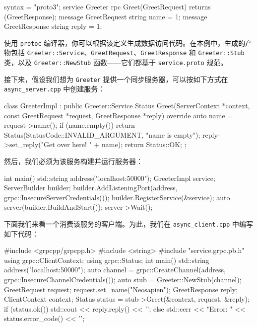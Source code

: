 \begin{codebox}[text]
syntax = "proto3";
service Greeter {
 rpc Greet(GreetRequest) returns (GreetResponse);
}
message GreetRequest {
 string name = 1;
}
message GreetResponse {
 string reply = 1;
}
\end{codebox}

\label{idx:1704}
使用 \texttt{protoc} 编译器，你可以根据该定义生成数据访问代码。在本例中，生成的产物包括 \texttt{Greeter::\allowbreak{}Service}、\texttt{Greet\allowbreak{}Request}、\texttt{Greet\allowbreak{}Response} 和 \texttt{Greeter::\allowbreak{}Stub} 类，以及 \texttt{Greeter::\allowbreak{}New\allowbreak{}Stub} 函数——它们都基于 \texttt{service.\allowbreak{}proto} 规范。

接下来，假设我们想为 \texttt{Greeter} 提供一个同步服务器，可以按如下方式在 \texttt{async\_\allowbreak{}server.\allowbreak{}cpp} 中创建服务：

\begin{codebox}[cpp]
class GreeterImpl : public Greeter::Service {
  Status Greet(ServerContext *context, const GreetRequest *request,
               GreetResponse *reply) override {
    auto name = request->name();
    if (name.empty()) {
      return Status(StatusCode::INVALID_ARGUMENT, "name is empty");
    }
    reply->set_reply("Get over here! " + name);
    return Status::OK;
  }
};
\end{codebox}

然后，我们必须为该服务构建并运行服务器：

\begin{codebox}[cpp]
int main() {
  std::string address("localhost:50000");
  GreeterImpl service;
  ServerBuilder builder;
  builder.AddListeningPort(address, grpc::InsecureServerCredentials());
  builder.RegisterService(&service);
  auto server(builder.BuildAndStart());
  server->Wait();
}
\end{codebox}

\label{idx:1705}
下面我们来看一个消费该服务的客户端。为此，我们在 \texttt{async\_\allowbreak{}client.\allowbreak{}cpp} 中编写如下代码：

\begin{codebox}[cpp]
#include <grpcpp/grpcpp.h>
#include <string>
#include "service.grpc.pb.h"
using grpc::ClientContext;
using grpc::Status;
int main() {
  std::string address("localhost:50000");
  auto channel =
      grpc::CreateChannel(address, grpc::InsecureChannelCredentials());
  auto stub = Greeter::NewStub(channel);
  GreetRequest request;
  request.set_name("Neosapien");
  GreetResponse reply;
  ClientContext context;
  Status status = stub->Greet(&context, request, &reply);
  if (status.ok()) {
    std::cout << reply.reply() << '\n';
  } else {
    std::cerr << "Error: " << status.error_code() << '\n';
  }
}
\end{codebox}

